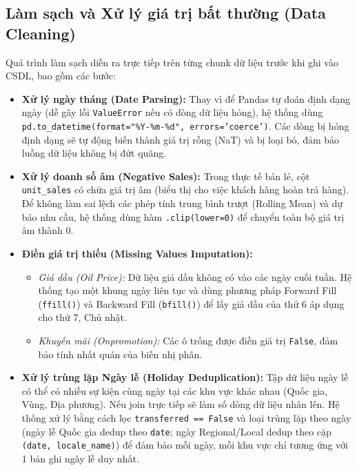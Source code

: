 \documentclass[12pt,a4paper]{report}
\begin{document}
\subsection{Làm sạch và Xử lý giá trị bất thường (Data Cleaning)}
Quá trình làm sạch diễn ra trực tiếp trên từng chunk dữ liệu trước khi ghi vào CSDL, bao gồm các bước:
\begin{itemize}
    \item \textbf{Xử lý ngày tháng (Date Parsing):} Thay vì để Pandas tự đoán định dạng ngày (dễ gây lỗi \texttt{ValueError} nếu có dòng dữ liệu hỏng), hệ thống dùng \texttt{pd.to\_datetime(format="\%Y-\%m-\%d", errors='coerce')}. Các dòng bị hỏng định dạng sẽ tự động biến thành giá trị rỗng (NaT) và bị loại bỏ, đảm bảo luồng dữ liệu không bị đứt quãng.
    \item \textbf{Xử lý doanh số âm (Negative Sales):} Trong thực tế bán lẻ, cột \texttt{unit\_sales} có chứa giá trị âm (biểu thị cho việc khách hàng hoàn trả hàng). Để không làm sai lệch các phép tính trung bình trượt (Rolling Mean) và dự báo nhu cầu, hệ thống dùng hàm \texttt{.clip(lower=0)} để chuyển toàn bộ giá trị âm thành 0.
    \item \textbf{Điền giá trị thiếu (Missing Values Imputation):}
    \begin{itemize}
        \item \textit{Giá dầu (Oil Price):} Dữ liệu giá dầu không có vào các ngày cuối tuần. Hệ thống tạo một khung ngày liên tục và dùng phương pháp Forward Fill (\texttt{ffill()}) và Backward Fill (\texttt{bfill()}) để lấy giá dầu của thứ 6 áp dụng cho thứ 7, Chủ nhật.
        \item \textit{Khuyến mãi (Onpromotion):} Các ô trống được điền giá trị \texttt{False}, đảm bảo tính nhất quán của biến nhị phân.
    \end{itemize}
    \item \textbf{Xử lý trùng lặp Ngày lễ (Holiday Deduplication):} Tập dữ liệu ngày lễ có thể có nhiều sự kiện cùng ngày tại các khu vực khác nhau (Quốc gia, Vùng, Địa phương). Nếu join trực tiếp sẽ làm số dòng dữ liệu nhân lên. Hệ thống xử lý bằng cách lọc \texttt{transferred == False} và loại trùng lặp theo ngày (ngày lễ Quốc gia dedup theo \texttt{date}; ngày Regional/Local dedup theo cặp \texttt{(date, locale\_name)}) để đảm bảo mỗi ngày, mỗi khu vực chỉ tương ứng với 1 bản ghi ngày lễ duy nhất.
\end{itemize}
\end{document}
